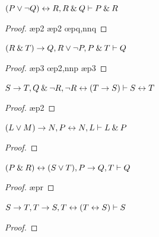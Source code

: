 \begin{earg}
\filbreak

\item $(P \vee {\neg} Q) \leftrightarrow R, R \mathbin{\&} Q \vdash P \mathbin{\&} R$\smallskip
\begin{proof}
 \pr{}
 \pr{}
 \ae{p2}
 
 \ae{p2}
 
 \oe{pq,nnq}
 
\end{proof}
\medskip


\item $(R \mathbin{\&} T) \rightarrow Q, R \vee {\neg} P, P \mathbin{\&} T \vdash Q$\smallskip
\begin{proof}
 \pr{}
 \pr{}
 \pr{}
 \ae{p3}
 
 \oe{p2,nnp}
 \ae{p3}
 
 
\end{proof}
\medskip

\filbreak

\item $S \rightarrow T, Q \mathbin{\&} {\neg} R, {\neg} R \leftrightarrow (T \rightarrow S) \vdash S \leftrightarrow T $\smallskip
\begin{proof}
 \pr{}
 \pr{}
 \pr{}
 \ae{p2}
 
 
\end{proof}
\medskip


\item $(L \vee M) \rightarrow N, P \leftrightarrow N, L \vdash L \mathbin{\&} P$\smallskip
\begin{proof}
 \pr{}
 \pr{}
 \pr{}
 
 
 
 
\end{proof}
\medskip

\item $(P \mathbin{\&} R) \leftrightarrow (S \vee T), P \rightarrow Q, T \vdash Q$
\begin{proof}
 \pr{}
 \pr{}
 \pr{}
 
 
 \ae{pr}
 
\end{proof}
\medskip

\filbreak

\item $S \rightarrow T, T \rightarrow S, T \leftrightarrow (T \leftrightarrow S) \vdash S$
\begin{proof}
 \pr{}
 \pr{}
 \pr{}
 
 
 
\end{proof}

\medskip

\end{earg}


